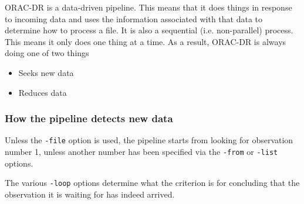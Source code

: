 \documentclass[twoside,11pt]{article}
\renewcommand{\_}{\texttt{\symbol{95}}}
\begin{document}
ORAC-DR is a data-driven pipeline. This means that it does things in
response to incoming data and uses the information associated with
that data to determine how to process a file. It is also a sequential
(i.e. non-parallel) process. This means it only does one thing at a
time. As a result, ORAC-DR is always doing one of two things

\begin{itemize}

\item 

Seeks new data


\item 

Reduces data

\end{itemize}
\subsubsection*{How the pipeline detects new data\label{The_ORAC-DR_Data_Loops_How_the_pipeline_detects_new_data}}


Unless the \texttt{-file} option is used, the pipeline starts from looking for observation number 1, unless another number has been specified via the 
\texttt{-from} or \texttt{-list} options.



The various \texttt{-loop} options determine what the criterion is for
concluding that the observation it is waiting for has indeed arrived.
\end{document}
